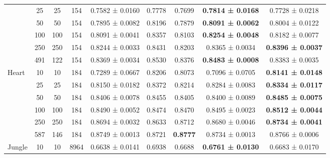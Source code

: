 \begin{table}
{\begin{tabular}[H]{@{}lcccccccc@{}}
                              & 25    & 25   & 154  & 0.7582 ± 0.0160      & 0.7778               & 0.7699          & \textbf{0.7814 ± 0.0168} & 0.7728 ± 0.0218          \\
                              & 50    & 50   & 154  & 0.7895 ± 0.0082      & 0.8196               & 0.7879          & \textbf{0.8091 ± 0.0062} & 0.8004 ± 0.0122          \\
                              & 100   & 100  & 154  & 0.8091 ± 0.0041      & 0.8357               & 0.8103          & \textbf{0.8254 ± 0.0048} & 0.8182 ± 0.0077          \\
                              & 250   & 250  & 154  & 0.8244 ± 0.0033      & 0.8431               & 0.8203          & 0.8365 ± 0.0034          & \textbf{0.8396 ± 0.0037} \\
                              & 491   & 122  & 154  & 0.8369 ± 0.0034      & 0.8530               & 0.8376          & \textbf{0.8483 ± 0.0008} & 0.8383 ± 0.0035          \\
                              \midrule
\multirow{6}{*}{Heart}        & 10    & 10   & 184  & 0.7289 ± 0.0667      & 0.8206               & 0.8073          & 0.7096 ± 0.0705          & \textbf{0.8141 ± 0.0148} \\
                              & 25    & 25   & 184  & 0.8150 ± 0.0182      & 0.8372               & 0.8214          & 0.8284 ± 0.0083          & \textbf{0.8334 ± 0.0117} \\
                              & 50    & 50   & 184  & 0.8406 ± 0.0078      & 0.8455               & 0.8405          & 0.8400 ± 0.0089          & \textbf{0.8485 ± 0.0075} \\
                              & 100   & 100  & 184  & 0.8490 ± 0.0052      & 0.8474               & 0.8470          & 0.8495 ± 0.0023          & \textbf{0.8512 ± 0.0044} \\
                              & 250   & 250  & 184  & 0.8694 ± 0.0032      & 0.8633               & 0.8712          & 0.8680 ± 0.0046          & \textbf{0.8734 ± 0.0041} \\
                              & 587   & 146  & 184  & 0.8749 ± 0.0013      & 0.8721               & \textbf{0.8777} & 0.8734 ± 0.0013          & 0.8766 ± 0.0006          \\
                              \midrule
\multirow{7}{*}{Jungle}       & 10    & 10   & 8964 & 0.6638 ± 0.0141      & 0.6938               & 0.6688          & \textbf{0.6761 ± 0.0130} & 0.6683 ± 0.0170          \\

\end{tabular}}
\end{table}

